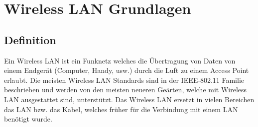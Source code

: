 \chapter{Wireless LAN Grundlagen}
\label{sec:TheoretischeGrundlagen}

\section{Definition}
Ein Wireless LAN ist ein Funknetz welches die Übertragung von Daten von einem Endgerät (Computer, Handy, usw.) durch die Luft zu einem Access Point erlaubt. Die meisten Wireless LAN Standards sind in der IEEE-802.11 Familie beschrieben und werden von den meisten neueren Geärten, welche mit Wireless LAN ausgestattet sind, unterstützt. Das Wireless LAN ersetzt in vielen Bereichen das LAN bzw. das Kabel, welches früher für die Verbindung mit einem LAN benötigt wurde.

